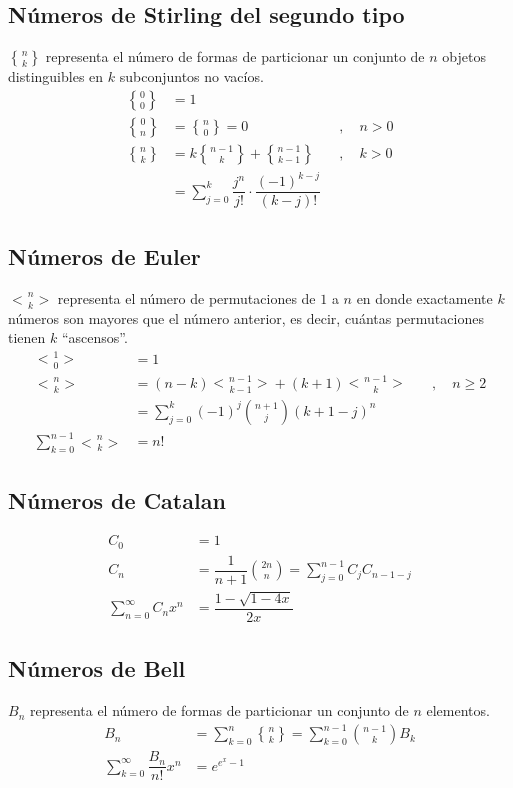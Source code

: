 \documentclass[11pt]{article}
\newcommand{\genstirlingII}[3]{%
	\genfrac{\{}{\}}{0pt}{#1}{#2}{#3}%
}
\newcommand{\genEuler}[3]{%
	\genfrac{<}{>}{0pt}{#1}{#2}{#3}%
}
\newcommand{\stirlingII}[2]{\genstirlingII{}{#1}{#2}}
\newcommand{\euler}[2]{\genEuler{}{#1}{#2}}
\begin{document}
		\subsection{Números de Stirling del segundo tipo}
			$\stirlingII{n}{k}$ representa el número de formas de particionar un conjunto de $n$ objetos distinguibles en $k$ subconjuntos no vacíos.
			\begin{align*}
				\stirlingII{0}{0} &= 1 \\
				\stirlingII{0}{n} &= \stirlingII{n}{0} = 0 \quad &, \quad n>0 \\
				\stirlingII{n}{k} &= k\stirlingII{n-1}{k} + \stirlingII{n-1}{k-1} \quad &, \quad k>0 \\
				&= \sum_{j=0}^{k} \dfrac{j^n}{j!} \cdot \dfrac{(-1)^{k-j}}{(k-j)!}
			\end{align*}
		
		\subsection{Números de Euler}
			$\euler{n}{k}$ representa el número de permutaciones de $1$ a $n$ en donde exactamente $k$ números son mayores que el número anterior, es decir, cuántas permutaciones tienen $k$ ``ascensos''.
			\begin{align*}
				\euler{1}{0} &= 1 \\
				\euler{n}{k} &= (n-k)\euler{n-1}{k-1} + (k+1)\euler{n-1}{k} \quad &, \quad n \geq 2 \\
				&= \sum_{j=0}^{k} (-1)^j \binom{n+1}{j} (k+1-j)^n \\
				\sum_{k=0}^{n-1} \euler{n}{k} &= n!
			\end{align*}
		
		\subsection{Números de Catalan}
			\begin{align*}
				C_0 &= 1 \\
				C_n &= \dfrac{1}{n+1}\binom{2n}{n} = \sum_{j=0}^{n-1} C_j C_{n-1-j} \\
				\sum_{n=0}^{\infty} C_n x^n &= \dfrac{1-\sqrt{1-4x}}{2x}
			\end{align*}
		
		\subsection{Números de Bell}
			$B_n$ representa el número de formas de particionar un conjunto de $n$ elementos.
			\begin{align*}
				B_n &= \sum_{k=0}^{n}\stirlingII{n}{k} = \sum_{k=0}^{n-1}\binom{n-1}{k} B_k \\
				\sum_{k=0}^{\infty} \dfrac{B_n}{n!}x^n &= e^{e^x-1}
			\end{align*}
		
\end{document}
